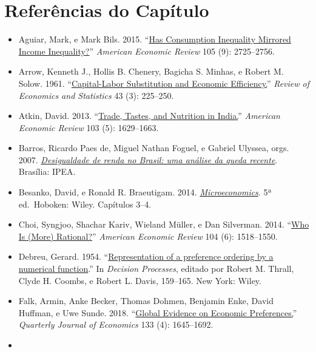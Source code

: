 \documentclass[11pt,twoside,openright]{book}
\providecommand{\tightlist}{\setlength{\itemsep}{0pt}\setlength{\parskip}{0pt}}
\begin{document}
\section{Referências do Capítulo}\label{referuxeancias-do-capuxedtulo}

\begin{itemize}
\tightlist
\item
  Aguiar, Mark, e Mark Bils. 2015.
  ``\href{https://doi.org/10.1257/aer.20120599}{Has Consumption
  Inequality Mirrored Income Inequality?}'' \emph{American Economic
  Review} 105 (9): 2725--2756.
\item
  Arrow, Kenneth J., Hollis B. Chenery, Bagicha S. Minhas, e Robert M.
  Solow. 1961. ``\href{https://doi.org/10.2307/1927286}{Capital-Labor
  Substitution and Economic Efficiency.}'' \emph{Review of Economics and
  Statistics} 43 (3): 225--250.
\item
  Atkin, David. 2013.
  ``\href{https://doi.org/10.1257/aer.103.5.1629}{Trade, Tastes, and
  Nutrition in India.}'' \emph{American Economic Review} 103 (5):
  1629--1663.
\item
  Barros, Ricardo Paes de, Miguel Nathan Foguel, e Gabriel Ulyssea,
  orgs. 2007.
  \href{https://repositorio.ipea.gov.br/handle/11058/3249}{\emph{Desigualdade
  de renda no Brasil: uma análise da queda recente}}. Brasília: IPEA.
\item
  Besanko, David, e Ronald R. Braeutigam. 2014.
  \href{https://books.google.com.br/books?id=BeoengEACAAJ}{\emph{Microeconomics}}.
  5ª ed.~Hoboken: Wiley. Capítulos 3--4.
\item
  Choi, Syngjoo, Shachar Kariv, Wieland Müller, e Dan Silverman. 2014.
  ``\href{https://doi.org/10.1257/aer.104.6.1518}{Who Is (More)
  Rational?}'' \emph{American Economic Review} 104 (6): 1518--1550.
\item
  Debreu, Gerard. 1954.
  ``\href{https://www.cambridge.org/core/books/abs/mathematical-economics/representation-of-a-preference-ordering-by-a-numerical-function/009AEFFF2E07235C5BBFFEF226353FE8}{Representation
  of a preference ordering by a numerical function}.'' In \emph{Decision
  Processes}, editado por Robert M. Thrall, Clyde H. Coombs, e Robert L.
  Davis, 159--165. New York: Wiley.
\item
  Falk, Armin, Anke Becker, Thomas Dohmen, Benjamin Enke, David Huffman,
  e Uwe Sunde. 2018. ``\href{https://doi.org/10.1093/qje/qjy013}{Global
  Evidence on Economic Preferences.}'' \emph{Quarterly Journal of
  Economics} 133 (4): 1645--1692.
\item

\end{itemize}
\end{document}
